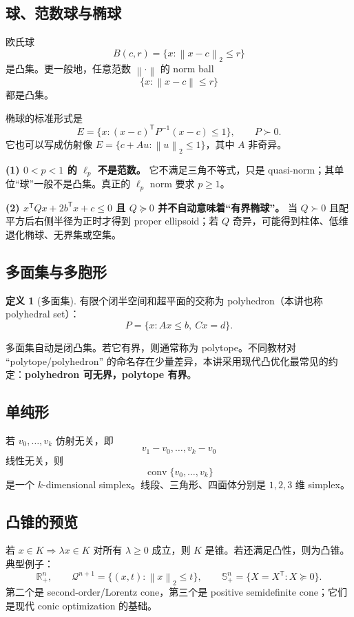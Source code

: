 \documentclass[11pt,a4paper,openany]{ctexrep}
\theoremstyle{definition}
\newtheorem{definition}[theorem]{定义}
\newcommand{\R}{\mathbb{R}}
\newcommand{\conv}{\operatorname{conv}}
\newcommand{\norm}[1]{\left\lVert #1\right\rVert}
\newcommand{\transpose}{\mathsf{T}}
\begin{document}
\subsection{球、范数球与椭球}
欧氏球
\[
B(c,r)=\{x:\norm{x-c}_2\le r\}
\]
是凸集。更一般地，任意范数 $\norm{\cdot}$ 的 norm ball
\[
\{x:\norm{x-c}\le r\}
\]
都是凸集。

椭球的标准形式是
\[
E=\{x:(x-c)^\transpose P^{-1}(x-c)\le1\},\qquad P\succ0.
\]
它也可以写成仿射像 $E=\{c+Au:\norm{u}_2\le1\}$，其中 $A$ 非奇异。\cite[\S2.2]{boyd}

\begin{warningbox}[两个常见的课堂记号陷阱]
\textbf{(1) $0<p<1$ 的 $\ell_p$ 不是范数。} 它不满足三角不等式，只是 quasi-norm；其单位“球”一般不是凸集。真正的 $\ell_p$ norm 要求 $p\ge1$。

\textbf{(2) $x^\transpose Qx+2b^\transpose x+c\le0$ 且 $Q\succeq0$ 并不自动意味着“有界椭球”。} 当 $Q\succ0$ 且配平方后右侧半径为正时才得到 proper ellipsoid；若 $Q$ 奇异，可能得到柱体、低维退化椭球、无界集或空集。
\end{warningbox}

\subsection{多面集与多胞形}
\begin{definition}[多面集]
有限个闭半空间和超平面的交称为 polyhedron（本讲也称 polyhedral set）：
\[
P=\{x:Ax\le b,\ Cx=d\}.
\]
\end{definition}

多面集自动是闭凸集。若它有界，则通常称为 polytope。不同教材对 ``polytope/polyhedron'' 的命名存在少量差异，本讲采用现代凸优化最常见的约定：\textbf{polyhedron 可无界，polytope 有界}。

\subsection{单纯形}
若 $v_0,\dots,v_k$ 仿射无关，即
\[
v_1-v_0,\dots,v_k-v_0
\]
线性无关，则
\[
\conv\{v_0,\dots,v_k\}
\]
是一个 $k$-dimensional simplex。线段、三角形、四面体分别是 $1,2,3$ 维 simplex。

\subsection{凸锥的预览}
若 $x\in K\Rightarrow \lambda x\in K$ 对所有 $\lambda\ge0$ 成立，则 $K$ 是锥。若还满足凸性，则为凸锥。典型例子：
\[
\R_+^n,\qquad
\mathcal Q^{n+1}=\{(x,t):\norm{x}_2\le t\},\qquad
\mathbb S_+^n=\{X=X^\transpose:X\succeq0\}.
\]
第二个是 second-order/Lorentz cone，第三个是 positive semidefinite cone；它们是现代 conic optimization 的基础。\cite[\S2.2,\S2.6]{boyd}\cite[Lecture~1--3]{bental}
\end{document}
